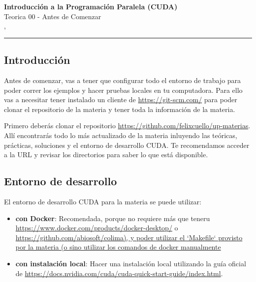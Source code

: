 



\begin{center}
  \LARGE\textbf{Introducción a la Programación Paralela (CUDA)} \\
  \Large{Teorica 00 - Antes de Comenzar} \\
  \normalsize{\currentsemester, \currentyear} \\
  \vspace{1em}
  \hrule
\end{center}

\vspace{1em}

\setcounter{section}{1}

\subsection{Introducción}
\label{sec:set_up}

Antes de comenzar, vas a tener que configurar todo el entorno de trabajo para poder correr los ejemplos y hacer pruebas
locales en tu computadora. Para ello vas a necesitar tener instalado un cliente de \href{git}{https://git-scm.com/} para
poder clonar el repositorio de la materia y tener toda la información de la materia.

Primero deberás clonar el repositorio
\href{https://github.com/felixcuello/up-materias}{https://github.com/felixcuello/up-materias}. Allí encontrarás todo lo más
actualizado de la materia inluyendo las teóricas, prácticas, soluciones y el entorno de desarrollo CUDA. Te recomendamos
acceder a la URL y revisar los directorios para saber lo que está disponible.

\subsection{Entorno de desarrollo}

El entorno de desarrollo CUDA para la materia se puede utilizar:

\begin{itemize}
  \item \textbf{con Docker}: Recomendada, porque no requiere más que teneru \href{Docker
    Desktop}{https://www.docker.com/products/docker-desktop/} o
    \href{Colima}{https://github.com/abiosoft/colima), y poder utilizar el `Makefile` provisto por la materia (o sino
    utilizar los comandos de docker manualmente}
  \item \textbf{con instalación local}: Hacer una instalación local utilizando la guía oficial de \href{CUDA de
    Nvidia}{https://docs.nvidia.com/cuda/cuda-quick-start-guide/index.html}.
\end{itemize}

